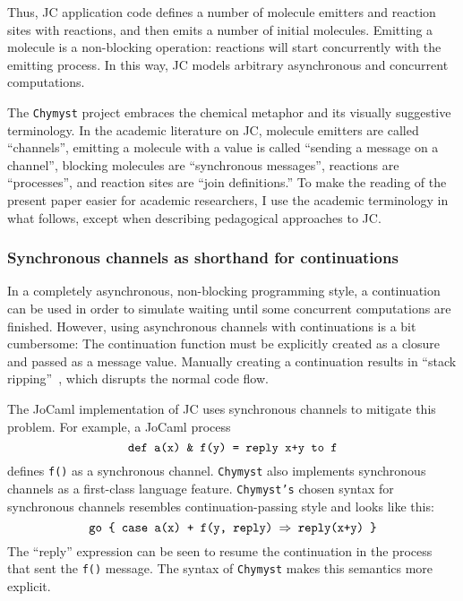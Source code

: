 \documentclass[sigplan,10pt,review,anonymous]{acmart}\settopmatter{printfolios=true}
\begin{document}
Thus, JC application code defines a number of molecule emitters and
reaction sites with reactions, and then emits a number of initial
molecules. Emitting a molecule is a non-blocking operation: reactions
will start concurrently with the emitting process. In this way, JC
models arbitrary asynchronous and concurrent computations.

The \texttt{Chymyst} project embraces the chemical metaphor and its
visually suggestive terminology. In the academic literature on JC,
molecule emitters are called ``channels'', emitting a molecule with
a value is called ``sending a message on a channel'', blocking molecules
are ``synchronous messages'', reactions are ``processes'', and
reaction sites are ``join definitions.'' To make the reading of
the present paper easier for academic researchers, I use the academic
terminology in what follows, except when describing pedagogical approaches
to JC. 

\subsubsection{Synchronous channels as shorthand for continuations}

In a completely asynchronous, non-blocking programming style, a continuation
can be used in order to simulate waiting until some concurrent computations
are finished. However, using asynchronous channels with continuations
is a bit cumbersome: The continuation function must be explicitly
created as a closure and passed as a message value. Manually creating
a continuation results in ``stack ripping''~\citep{Ady2002}, which
disrupts the normal code flow. 

The JoCaml implementation of JC uses synchronous channels to mitigate
this problem. For example, a JoCaml process 
\[
\text{\texttt{def a(x) \& f(y) = reply x+y to f}}
\]
defines \texttt{f()} as a synchronous channel. \texttt{Chymyst} also
implements synchronous channels as a first-class language feature.
\texttt{Chymyst's} chosen syntax for synchronous channels resembles
continuation-passing style and looks like this:
\[
\text{\texttt{go \{ case a(x) + f(y, reply) \ensuremath{\Rightarrow} reply(x+y) \}}}
\]
The ``reply'' expression can be seen to resume the continuation
in the process that sent the \texttt{f()} message. The syntax of \texttt{Chymyst}
makes this semantics more explicit.
\end{document}
